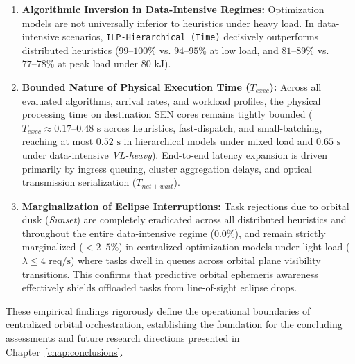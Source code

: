\begin{enumerate}
    \item \textbf{Algorithmic Inversion in Data-Intensive Regimes:} 
    Optimization models are not universally inferior to heuristics under heavy load. In data-intensive scenarios, \texttt{ILP-Hierarchical (Time)} decisively outperforms distributed heuristics ($99\text{--}100\%$ vs. $94\text{--}95\%$ at low load, and $81\text{--}89\%$ vs. $77\text{--}78\%$ at peak load under $80\text{ kJ}$). 

    \item \textbf{Bounded Nature of Physical Execution Time ($T_{exec}$):} 
    Across all evaluated algorithms, arrival rates, and workload profiles, the physical processing time on destination SEN cores remains tightly bounded ($T_{exec} \approx 0.17\text{--}0.48\text{ s}$ across heuristics, fast-dispatch, and small-batching, reaching at most $0.52\text{ s}$ in hierarchical models under mixed load and $0.65\text{ s}$ under data-intensive \textit{VL-heavy}). End-to-end latency expansion is driven primarily by ingress queuing, cluster aggregation delays, and optical transmission serialization ($T_{net+wait}$).

    \item \textbf{Marginalization of Eclipse Interruptions:} 
    Task rejections due to orbital dusk (\textit{Sunset}) are completely eradicated across all distributed heuristics and throughout the entire data-intensive regime ($0.0\%$), and remain strictly marginalized ($<2\text{--}5\%$) in centralized optimization models under light load ($\lambda \le 4\text{ req/s}$) where tasks dwell in queues across orbital plane visibility transitions. This confirms that predictive orbital ephemeris awareness effectively shields offloaded tasks from line-of-sight eclipse drops.
\end{enumerate}

These empirical findings rigorously define the operational boundaries of centralized orbital orchestration, establishing the foundation for the concluding assessments and future research directions presented in Chapter~\ref{chap:conclusions}.